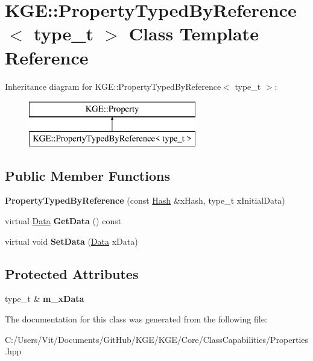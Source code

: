 \hypertarget{class_k_g_e_1_1_property_typed_by_reference}{\section{K\-G\-E\-:\-:Property\-Typed\-By\-Reference$<$ type\-\_\-t $>$ Class Template Reference}
\label{class_k_g_e_1_1_property_typed_by_reference}
}
Inheritance diagram for K\-G\-E\-:\-:Property\-Typed\-By\-Reference$<$ type\-\_\-t $>$\-:\begin{figure}[H]
\begin{center}
\leavevmode
\includegraphics[height=2.000000cm]{class_k_g_e_1_1_property_typed_by_reference}
\end{center}
\end{figure}
\subsection*{Public Member Functions}
\begin{DoxyCompactItemize}
\item 
\hypertarget{class_k_g_e_1_1_property_typed_by_reference_aff31c400c785be13deea79b35be3f6ff}{{\bfseries Property\-Typed\-By\-Reference} (const \hyperlink{class_k_g_e_1_1_hash}{Hash} \&x\-Hash, type\-\_\-t x\-Initial\-Data)}\label{class_k_g_e_1_1_property_typed_by_reference_aff31c400c785be13deea79b35be3f6ff}

\item 
\hypertarget{class_k_g_e_1_1_property_typed_by_reference_a6ee5cda8c10bc9a4f82499f9f27b90c8}{virtual \hyperlink{class_k_g_e_1_1_data}{Data} {\bfseries Get\-Data} () const }\label{class_k_g_e_1_1_property_typed_by_reference_a6ee5cda8c10bc9a4f82499f9f27b90c8}

\item 
\hypertarget{class_k_g_e_1_1_property_typed_by_reference_af74dd297ad8db9d3e3e75d0aef82dd29}{virtual void {\bfseries Set\-Data} (\hyperlink{class_k_g_e_1_1_data}{Data} x\-Data)}\label{class_k_g_e_1_1_property_typed_by_reference_af74dd297ad8db9d3e3e75d0aef82dd29}

\end{DoxyCompactItemize}
\subsection*{Protected Attributes}
\begin{DoxyCompactItemize}
\item 
\hypertarget{class_k_g_e_1_1_property_typed_by_reference_a1b002909b55b67d036ef6ccc4afb4f84}{type\-\_\-t \& {\bfseries m\-\_\-x\-Data}}\label{class_k_g_e_1_1_property_typed_by_reference_a1b002909b55b67d036ef6ccc4afb4f84}

\end{DoxyCompactItemize}


The documentation for this class was generated from the following file\-:\begin{DoxyCompactItemize}
\item 
C\-:/\-Users/\-Vit/\-Documents/\-Git\-Hub/\-K\-G\-E/\-K\-G\-E/\-Core/\-Class\-Capabilities/Properties.\-hpp\end{DoxyCompactItemize}
